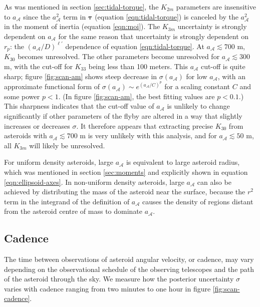 \documentclass[fleqn,usenatbib]{mnras}
\begin{document}
As was mentioned in section \ref{sec:tidal-torque}, the $K_{2m}$ parameters are insensitive to $a_\mathcal{A}$ since the $a_\mathcal{A}^2$ term in $\bm \tau$ (equation \ref{eqn:tidal-torque}) is canceled by the $a_\mathcal{A}^2$ in the moment of inertia (equation \ref{eqn:moi}). The $K_{3m}$ uncertainty is strongly dependent on $a_\mathcal{A}$ for the same reason that uncertainty is strongly dependent on $r_p$: the $(a_\mathcal{A}/D)^{\ell'}$ dependence of equation \ref{eqn:tidal-torque}. At $a_\mathcal{A} \lesssim 700$ m, $K_{30}$ becomes unresolved. The other parameters become unresolved for $a_\mathcal{A} \lesssim 300$ m, with the cut-off for $K_{33}$ being less than 100 meters. This $a_\mathcal{A}$ cut-off is quite sharp; figure \ref{fig:scan-am} shows steep decrease in $\sigma(a_\mathcal{A})$ for low $a_\mathcal{A}$, with an approximate functional form of $\sigma(a_\mathcal{A}) \sim e^{(a_\mathcal{A}/C)^p}$ for a scaling constant $C$ and some power $p < 1$. (In figure \ref{fig:scan-am}, the best fitting values are $p < 0.1$.) This sharpness indicates that the cut-off value of $a_\mathcal{A}$ is unlikely to change significantly if other parameters of the flyby are altered in a way that slightly increases or decreases $\sigma$. It therefore appears that extracting precise $K_{30}$ from asteroids with $a_\mathcal{A} \lesssim 700$ m is very unlikely with this analysis, and for $a_\mathcal{A} \lesssim 50$ m, all $K_{3m}$ will likely be unresolved.

For uniform density asteroids, large $a_\mathcal{A}$ is equivalent to large asteroid radius, which was mentioned in section \ref{sec:moments} and explicitly shown in equation \ref{eqn:ellipsoid-axes}. In non-uniform density asteroids, large $a_\mathcal{A}$ can also be achieved by distributing the mass of the asteroid near the surface, because the $r^2$ term in the integrand of the definition of $a_\mathcal{A}$ causes the density of regions distant from the asteroid centre of mass to dominate $a_\mathcal{A}$.




\subsection{Cadence}
\label{sec:scan-cadence}

The time between observations of asteroid angular velocity, or cadence, may vary depending on the observational schedule of the observing telescopes and the path of the asteroid through the sky.  We measure how the posterior uncertainty $\sigma$ varies with cadence ranging from two minutes to one hour in figure \ref{fig:scan-cadence}.
\end{document}
